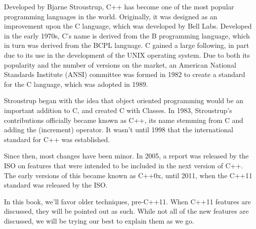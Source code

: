 
Developed by Bjarne Stroustrup, C++ has become one of the most popular programming languages in the world. 
Originally, it was designed as an improvement upon the C language, which was developed by Bell Labs. 
Developed in the early 1970s, C's name is derived from the B programming language, which in turn was derived from the BCPL language. 
C gained a large following, in part due to its use in the development of the UNIX operating system. 
Due to both its popularity and the number of versions on the market, an American National Standards Institute (ANSI) committee was formed in 1982 to create a standard for the C language, which was adopted in 1989.

Stroustrup began with the idea that object oriented programming would be an important addition to C, and created C with Classes.
In 1983, Stroustrup's contributions officially became known as C++, its name stemming from C and adding the \Code{++} (increment) operator. 
It wasn't until 1998 that the international standard for C++ was established.

Since then, most changes have been minor. 
In 2005, a report was released by the ISO on features that were intended to be included in the next version of C++. 
The early versions of this became known as C++0x, until 2011, when the C++11 standard was released by the ISO.

In this book, we'll favor older techniques, pre-C++11. 
When C++11 features are discussed, they will be pointed out as such. 
While not all of the new features are discussed, we will be trying our best to explain them as we go.

